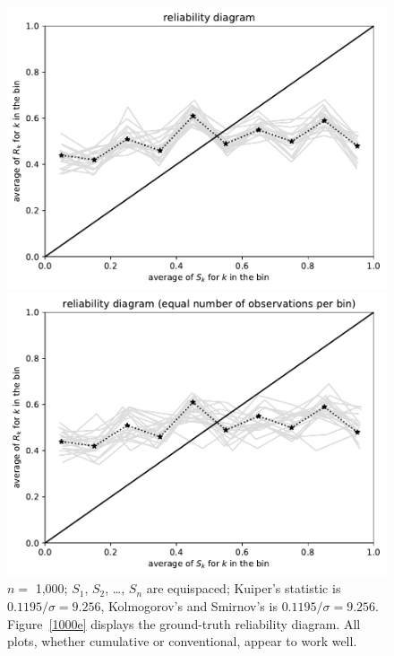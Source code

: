 \documentclass{article}
\begin{document}
\begin{figure}
\begin{centering}
\parbox{\imsize}{\includegraphics[width=\imsize]
                {./codes/unweighted/1000_10_0_0/equiprob.pdf}}
\quad\quad
\parbox{\imsize}{\includegraphics[width=\imsize]
                {./codes/unweighted/1000_10_0_0/equisamp.pdf}}

\end{centering}
\caption{$n =$ 1,000; $S_1$, $S_2$, \dots, $S_n$ are equispaced;
         Kuiper's statistic is $0.1195 / \sigma = 9.256$,
         Kolmogorov's and Smirnov's is $0.1195 / \sigma = 9.256$.
Figure~\ref{1000e} displays the ground-truth reliability diagram.
All plots, whether cumulative or conventional, appear to work well.
}
\label{1000}
\end{figure}
\end{document}
